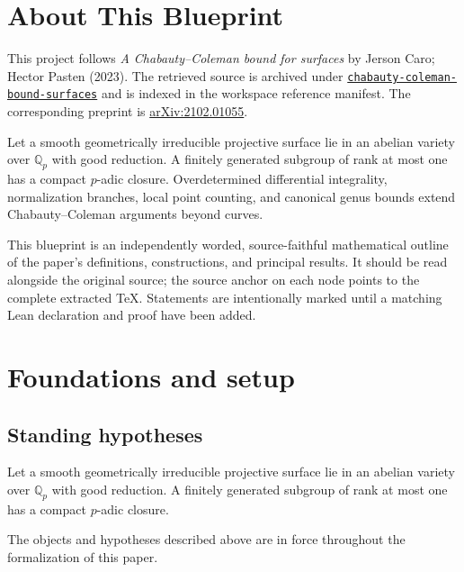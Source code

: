 

\chapter*{About This Blueprint}
\label{chabauty-coleman-bound-surfaces-about}

This project follows \emph{A Chabauty--Coleman bound for surfaces} by Jerson Caro; Hector Pasten (2023). The
retrieved source is archived under
\href{../../../../../references/chabauty-coleman-bound-surfaces/}{\texttt{chabauty-coleman-bound-surfaces}} and is indexed in
the workspace reference manifest. The corresponding preprint is
\href{https://arxiv.org/abs/2102.01055}{arXiv:2102.01055}.

Let a smooth geometrically irreducible projective surface lie in an abelian variety over $\mathbb Q_p$ with good reduction. A finitely generated subgroup of rank at most one has a compact $p$-adic closure. Overdetermined differential integrality, normalization branches, local point counting, and canonical genus bounds extend Chabauty--Coleman arguments beyond curves.

This blueprint is an independently worded, source-faithful mathematical
outline of the paper's definitions, constructions, and principal results. It
should be read alongside the original source; the source anchor on each node
points to the complete extracted TeX. Statements are intentionally marked
\notready until a matching Lean declaration and proof have been added.

\chapter{Foundations and setup}
\label{chap:chabauty-coleman-bound-surfaces-foundations}

\section{Standing hypotheses}
\label{sec:chabauty-coleman-bound-surfaces-standing}

Let a smooth geometrically irreducible projective surface lie in an abelian variety over $\mathbb Q_p$ with good reduction. A finitely generated subgroup of rank at most one has a compact $p$-adic closure.

\begin{convention}
\label{chabauty-coleman-bound-surfaces-setup}
The objects and hypotheses described above are in force throughout the
formalization of this paper.
\notready
\end{convention}

